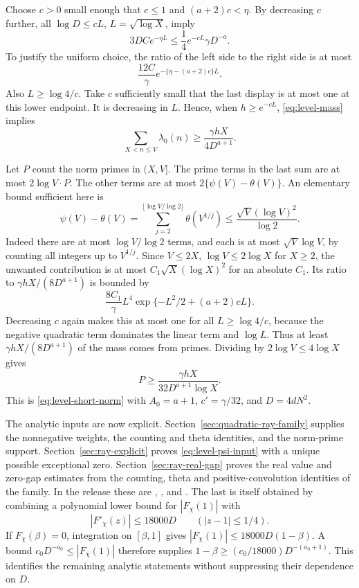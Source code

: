 Choose \(c>0\) small enough that \(c\leq1\) and
\((a+2)c<\eta\). By decreasing \(c\) further, all
\(\log D\leq cL\), \(L=\sqrt{\log X}\), imply
\[
       3DCe^{-\eta L}
                     \leq\frac14 e^{-cL}\gamma D^{-a}.
\]
To justify the uniform choice, the ratio of the left side to the
right side is at most
\[
       \frac{12C}{\gamma}
             e^{-\{\eta-(a+2)c\}L}.
\]
Also \(L\geq\log4/c\). Take \(c\) sufficiently small that the last
display is at most one at this lower endpoint. It is decreasing
in \(L\). Hence, when \(h\geq e^{-cL}\),
\eqref{eq:level-mass} implies
\[
          \sum_{X<n\leq V}\lambda_0(n)
                       \geq\frac{\gamma hX}{4D^{a+1}}.
\]

Let \(P\) count the norm primes in \((X,V]\).
The prime terms in the last sum are at most \(2\log V\cdot P\).
The other terms are at most
\(2\{\psi(V)-\theta(V)\}\).
An elementary bound sufficient here is
\[
 \psi(V)-\theta(V)
       =\sum_{j=2}^{\lfloor\log V/\log2\rfloor}
                         \theta(V^{1/j})
       \leq\frac{\sqrt V(\log V)^2}{\log2}.
\]
Indeed there are at most \(\log V/\log2\) terms, and each is at
most \(\sqrt V\log V\), by counting all integers up to
\(V^{1/j}\). Since \(V\leq2X\), \(\log V\leq2\log X\) for
\(X\geq2\), the unwanted contribution is at most
\(C_1\sqrt X(\log X)^2\) for an absolute \(C_1\).
Its ratio to \(\gamma hX/(8D^{a+1})\) is bounded by
\[
 \frac{8C_1}{\gamma}L^4
        \exp\{-L^2/2+(a+2)cL\}.
\]
Decreasing \(c\) again makes this at most one for all
\(L\geq\log4/c\), because the negative quadratic term dominates
the linear term and \(\log L\). Thus at least
\(\gamma hX/(8D^{a+1})\) of the mass comes from primes.
Dividing by \(2\log V\leq4\log X\) gives
\[
             P\geq
               \frac{\gamma hX}{32D^{a+1}\log X}.
\]
This is \eqref{eq:level-short-norm} with
\(A_0=a+1\), \(c'=\gamma/32\), and \(D=4dN^2\).

The analytic inputs are now explicit.
Section~\ref{sec:quadratic-ray-family} supplies the nonnegative weights,
the counting and theta identities, and the norm-prime support. Section~\ref{sec:ray-explicit} proves \eqref{eq:level-psi-input} with
a unique possible exceptional zero.
Section~\ref{sec:ray-real-gap} proves the real value and zero-gap estimates
from the counting, theta and positive-convolution identities of the family. In the release these are
,
, and
.
The last is itself obtained by combining a polynomial lower bound
for \(|F_\chi(1)|\) with
\[
             |F'_\chi(z)|\leq18000D
                           \qquad(|z-1|\leq1/4).
\]
If \(F_\chi(\beta)=0\), integration on \([\beta,1]\) gives
\(|F_\chi(1)|\leq18000D(1-\beta)\).
A bound \(c_0D^{-a_0}\leq|F_\chi(1)|\) therefore supplies
\(1-\beta\geq(c_0/18000)D^{-(a_0+1)}\).
This identifies the remaining analytic statements without suppressing
their dependence on \(D\).

